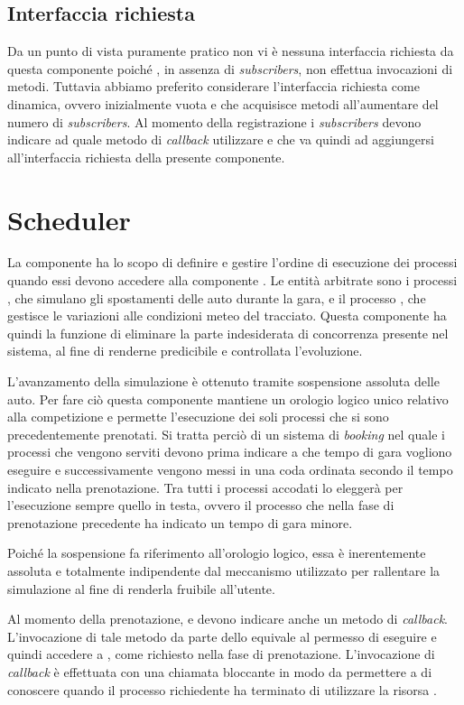 \subsection*{Interfaccia richiesta}
Da un punto di vista puramente pratico non vi è nessuna interfaccia richiesta da questa componente poiché \evdisp{}, in assenza di \textit{subscribers}, non effettua invocazioni di metodi. Tuttavia abbiamo preferito considerare l'interfaccia richiesta come dinamica, ovvero inizialmente vuota e che acquisisce metodi all'aumentare del numero di \textit{subscribers}. Al momento della registrazione i \textit{subscribers} devono indicare ad \evdisp{} quale metodo di \textit{callback} utilizzare e che va quindi ad aggiungersi all'interfaccia richiesta della presente componente.


\section{Scheduler}
\label{sec:scheduler}
La componente \sched{} ha lo scopo di definire e gestire l'ordine di esecuzione dei processi quando essi devono accedere alla componente \track{}.
Le entità arbitrate sono i processi \car{}, che simulano gli spostamenti delle auto durante la gara, e il processo \weather{}, che gestisce le variazioni alle condizioni meteo del tracciato. Questa componente ha quindi la funzione di eliminare la parte indesiderata di concorrenza presente nel sistema, al fine di renderne predicibile e controllata l'evoluzione.

L'avanzamento della simulazione è ottenuto tramite sospensione assoluta delle auto. Per fare ciò questa componente mantiene un orologio logico unico relativo alla competizione e permette l'esecuzione dei soli processi che si sono precedentemente prenotati. Si tratta perciò di un sistema di \textit{booking} nel quale i processi che vengono serviti devono prima indicare a che tempo di gara vogliono eseguire e successivamente vengono messi in una coda ordinata secondo il tempo indicato nella prenotazione. Tra tutti i processi accodati lo \sched{} eleggerà per l'esecuzione sempre quello in testa, ovvero il processo che nella fase di prenotazione precedente ha indicato un tempo di gara minore.

Poiché la sospensione fa riferimento all'orologio logico, essa è inerentemente assoluta e totalmente indipendente dal meccanismo utilizzato per rallentare la simulazione al fine di renderla fruibile all'utente.

Al momento della prenotazione, \car{} e \weather{} devono indicare anche un metodo di \textit{callback}. L'invocazione di tale metodo da parte dello \sched{} equivale al permesso di eseguire e quindi accedere a \track{}, come richiesto nella fase di prenotazione.
L'invocazione di \textit{callback} è effettuata con una chiamata bloccante in modo da permettere a \sched{} di conoscere quando il processo richiedente ha terminato di utilizzare la risorsa \track{}.

